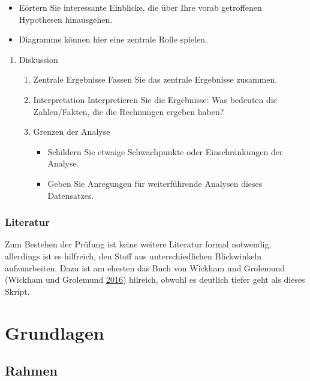 \documentclass[12pt,ngerman,]{book}
\providecommand{\tightlist}{%
  \setlength{\itemsep}{0pt}\setlength{\parskip}{0pt}}
\theoremstyle{definition}
\theoremstyle{definition}
\theoremstyle{remark}
\begin{document}
\begin{itemize}
\tightlist
\item
  Eörtern Sie interessante Einblicke, die über Ihre vorab getroffenen
  Hypothesen hinausgehen.
\item
  Diagramme können hier eine zentrale Rolle spielen.
\end{itemize}

\begin{enumerate}
\def\labelenumi{\arabic{enumi}.}
\setcounter{enumi}{3}
\item
  Diskussion

  \begin{enumerate}
  \def\labelenumii{\arabic{enumii}.}
  \item
    Zentrale Ergebnisse Fassen Sie das zentrale Ergebnisse zusammen.
  \item
    Interpretation Interpretieren Sie die Ergebnisse: Was bedeuten die
    Zahlen/Fakten, die die Rechnungen ergeben haben?
  \item
    Grenzen der Analyse

    \begin{itemize}
    \tightlist
    \item
      Schildern Sie etwaige Schwachpunkte oder Einschränkungen der
      Analyse.
    \item
      Geben Sie Anregungen für weiterführende Analysen dieses
      Datensatzes.
    \end{itemize}
  \end{enumerate}
\end{enumerate}

\section{Literatur}\label{literatur}

Zum Bestehen der Prüfung ist keine weitere Literatur formal notwendig;
allerdings ist es hilfreich, den Stoff aus unterschiedlichen
Blickwinkeln aufzuarbeiten. Dazu ist am ehesten das Buch von Wickham und
Grolemund (Wickham und Grolemund \protect\hyperlink{ref-r4ds}{2016})
hilreich, obwohl es deutlich tiefer geht als dieses Skript.

\mainmatter

\setcounter{chapter}{0} \part{Grundlagen}

\chapter{Rahmen}\label{rahmen}
\end{document}
